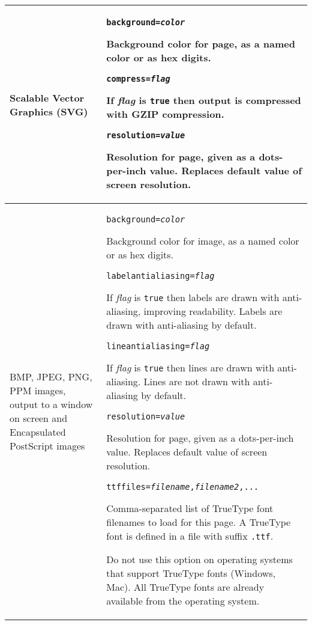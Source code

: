 \begin{longtable}{|p{4cm}|p{10cm}|}
\hline

Scalable Vector Graphics (SVG) &

\texttt{background=\textit{color}}

Background color for page, as a named color or as hex digits.

\vspace{10pt}
\texttt{compress=\textit{flag}}

If \textit{flag} is \texttt{true} then output is compressed with GZIP
compression.

\vspace{10pt}
\texttt{resolution=\textit{value}}

Resolution for page, given as a dots-per-inch value.  Replaces
default value of screen resolution. \\

\hline

BMP, JPEG, PNG, PPM images, output to a window on screen
and Encapsulated PostScript images &

\texttt{background=\textit{color}}

Background color for image, as a named color or as hex digits.

\vspace{10pt}
\texttt{labelantialiasing=\textit{flag}}

If \textit{flag} is \texttt{true} then
labels are drawn with anti-aliasing, improving readability.
Labels are drawn with anti-aliasing by default.

\vspace{10pt}
\texttt{lineantialiasing=\textit{flag}}

If \textit{flag} is \texttt{true} then
lines are drawn with anti-aliasing.
Lines are not drawn with anti-aliasing by default.

\vspace{10pt}
\texttt{resolution=\textit{value}}

Resolution for page, given as a dots-per-inch value.  Replaces
default value of screen resolution.

\vspace{10pt}
\texttt{ttffiles=\textit{filename},\textit{filename2},...}

Comma-separated list of TrueType font filenames
to load for this page.
A TrueType font is defined in a file
with suffix \texttt{.ttf}.

Do not use this option on operating systems that support
TrueType fonts (Windows, Mac).  All TrueType
fonts are already available from the operating system.


\end{longtable}
